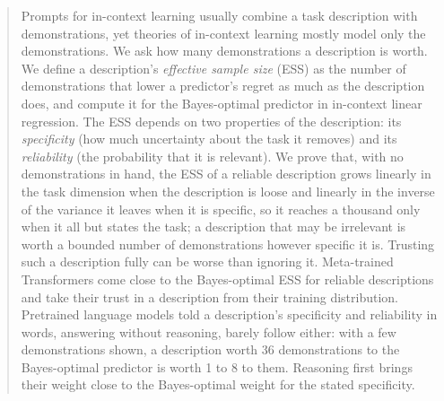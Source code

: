 \documentclass{article}
\begin{document}
\raggedbottom

\printAffiliationsAndNotice{}

\begin{abstract}
Prompts for in-context learning usually combine a task description with demonstrations, yet theories of in-context learning mostly model only the demonstrations. We ask how many demonstrations a description is worth. We define a description's \emph{effective sample size} (ESS) as the number of demonstrations that lower a predictor's regret as much as the description does, and compute it for the Bayes-optimal predictor in in-context linear regression. The ESS depends on two properties of the description: its \emph{specificity} (how much uncertainty about the task it removes) and its \emph{reliability} (the probability that it is relevant). We prove that, with no demonstrations in hand, the ESS of a reliable description grows linearly in the task dimension when the description is loose and linearly in the inverse of the variance it leaves when it is specific, so it reaches a thousand only when it all but states the task; a description that may be irrelevant is worth a bounded number of demonstrations however specific it is. Trusting such a description fully can be worse than ignoring it. Meta-trained Transformers come close to the Bayes-optimal ESS for reliable descriptions and take their trust in a description from their training distribution. Pretrained language models told a description's specificity and reliability in words, answering without reasoning, barely follow either: with a few demonstrations shown, a description worth 36 demonstrations to the Bayes-optimal predictor is worth 1 to 8 to them. Reasoning first brings their weight close to the Bayes-optimal weight for the stated specificity.
\end{abstract}
\end{document}
